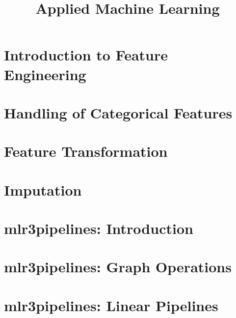 \documentclass[11pt,compress,t,notes=noshow, aspectratio=169, xcolor=table]{beamer}
\title{Applied Machine Learning}
\date{}
\begin{document}
\newcommand{\titlefigure}{figure/empty}
\newcommand{\learninggoals}{
\item Categorical Encoding: \newline One-Hot and Target/Impact Encoding
\item Feature Transformations: \newline Normalization and Box-Cox Transformation
\item Intro to mlr3pipelines}



\section{Introduction to Feature Engineering}



\section{Handling of Categorical Features}


\section{Feature Transformation}
%

\section{Imputation}



\section{mlr3pipelines: Introduction}

%
\section{mlr3pipelines: Graph Operations}

\section{mlr3pipelines: Linear Pipelines}

\endlecture
\end{document}
